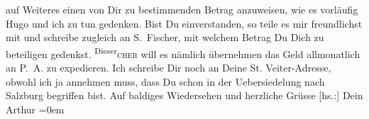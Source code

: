 \begin{ledgroupsized}[t]{13cm}
               auf Weiteres einen von Dir zu bestimmenden Betrag anzuweisen, wie es vorläufig Hugo und ich zu tun gedenken. Bist Du
               einverstanden, so teile es mir freundlichst mit und schreibe zugleich an S. Fischer, mit welchem Betrag Du Dich zu
               beteiligen ge{\pb}denkst. \substVorne{}\textsuperscript{Dieser}{\allowbreak}\substDazwischen{}\textsc{cher}\substHinten{} will es nämlich übernehmen das Geld allmonatlich an P. A. zu expedieren.\pend
           \pstart
           Ich schreibe Dir noch an Deine St.
               Veiter-Adresse, obwohl ich ja annehmen muss, dass Du schon in der Uebersiedelung
               nach Salzburg begriffen bist.\pend
           \pstart
           Auf baldiges Wiedersehen und herzliche Grüsse\pend
           \pstart
           {[}hs.:{]} Dein{\\[\baselineskip]}\spacefill\mbox{Arthur}\pend
           \leftskip=0em{}
         
         \endnumbering{}\end{ledgroupsized}  \newcommand{\dateiname}{L02099}\newcommand{\titel}{Arthur Schnitzler an Hermann Bahr, 16. 11. 1912}\newcommand{\editorInnen}{ Kurt Ifkovits,  Martin Anton Müller}
      